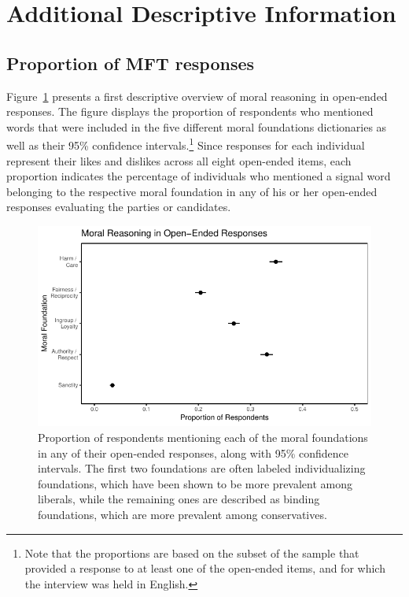 \documentclass[12pt]{article}
\begin{document}
\clearpage
\section{Additional Descriptive Information}\label{app:oview}
\renewcommand\thefigure{\thesection.\arabic{figure}}
\renewcommand\thetable{\thesection.\arabic{table}}
\setcounter{figure}{0}
\setcounter{table}{0}




\subsection{Proportion of MFT responses}

Figure~\ref{fig:prop_ideol} presents a first descriptive overview of moral reasoning in open-ended responses. The figure displays the proportion of respondents who mentioned words that were included in the five different moral foundations dictionaries as well as their 95\% confidence intervals.\footnote{Note that the proportions are based on the subset of the sample that provided a response to at least one of the open-ended items, and for which the interview was held in English.} Since responses for each individual represent their likes and dislikes across all eight open-ended items, each proportion indicates the percentage of individuals who mentioned a signal word belonging to the respective moral foundation in any of his or her open-ended responses evaluating the parties or candidates.

\begin{figure}[ht]\centering
\includegraphics{../calc/fig/prop_mft.pdf}
\caption{Proportion of respondents mentioning each of the moral foundations in any of their open-ended responses, along with 95\% confidence intervals. The first two foundations are often labeled individualizing foundations, which have been shown to be more prevalent among liberals, while the remaining ones are described as binding foundations, which are more prevalent among conservatives.}\label{fig:prop_ideol}
\end{figure}
\end{document}
